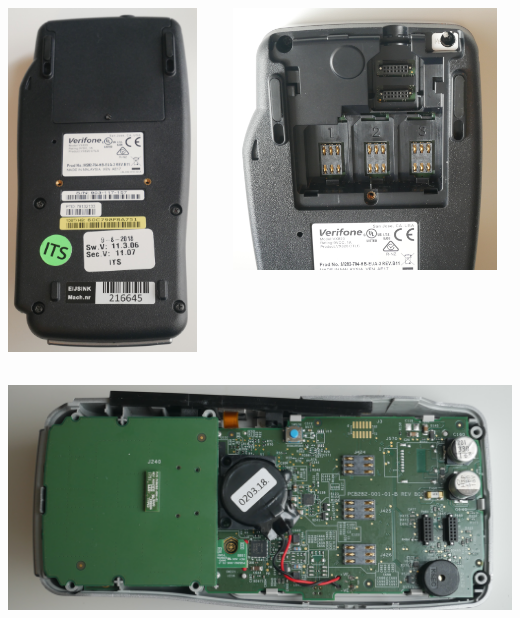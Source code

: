 \documentclass[12pt,aspectratio=169]{beamer}
\begin{document}
\begin{frame}
\begin{columns}
	\begin{column}{0.5\textwidth}
		\centering
		\includegraphics[width=5cm]{media/outside_bottom}	
	\end{column}
	\begin{column}{0.5\textwidth}
		\centering
		\includegraphics[width=7cm]{media/outside_bottom_under_flap}
	\end{column}
\end{columns}
\end{frame}


\begin{frame}
\centering
\includegraphics[width=14cm]{media/pcb}
\end{frame}
\end{document}

